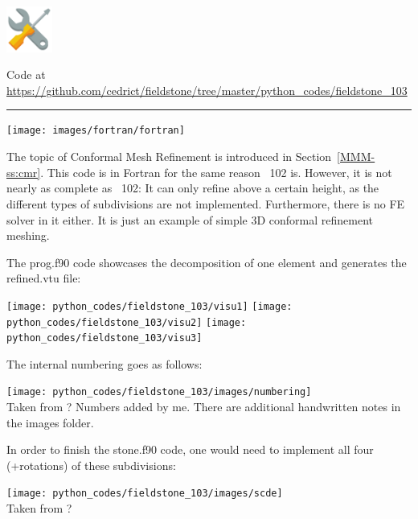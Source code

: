 \includegraphics[height=1.5cm]{images/pictograms/tools}



\begin{center}
Code at \url{https://github.com/cedrict/fieldstone/tree/master/python_codes/fieldstone_103}
\end{center}

\par\noindent\rule{\textwidth}{0.4pt}


\begin{center}
\texttt{[image: images/fortran/fortran]} 
\end{center}

The topic of Conformal Mesh Refinement is introduced in Section~\ref{MMM-ss:cmr}.
This code is in Fortran for the same reason \stone~102 is. 
However, it is not nearly as complete as \stone~102: It can only refine 
above a certain height, as the different types of subdivisions are not implemented.
Furthermore, there is no FE solver in it either. It is just an example of 
simple 3D conformal refinement meshing.

The {\filenamefont prog.f90} code showcases the decomposition of one element and generates
the {\filenamefont refined.vtu} file:
\begin{center}
\texttt{[image: python\_codes/fieldstone\_103/visu1]}
\texttt{[image: python\_codes/fieldstone\_103/visu2]}
\texttt{[image: python\_codes/fieldstone\_103/visu3]}
\end{center}
The internal numbering goes as follows:
\begin{center}
\texttt{[image: python\_codes/fieldstone\_103/images/numbering]}\\
{\captionfont Taken from ? Numbers added by me. There are additional handwritten notes
in the images folder.}
\end{center}

In order to finish the {\filenamefont stone.f90} code, one would need to 
implement all four (+rotations) of these subdivisions:
\begin{center}
\texttt{[image: python\_codes/fieldstone\_103/images/scde]}\\
{\captionfont Taken from ?}
\end{center}

